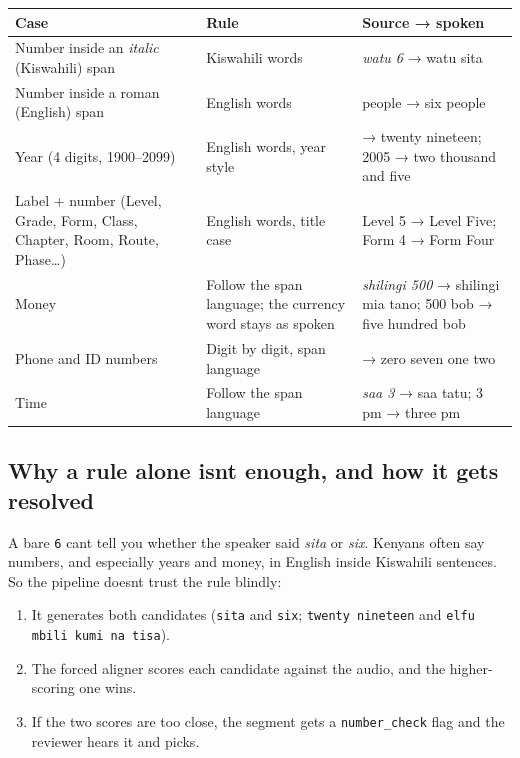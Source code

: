\documentclass[11pt]{article}
\begin{document}
\begin{longtable}[]{@{}>{\raggedright\arraybackslash}p{}>{\raggedright\arraybackslash}p{}>{\raggedright\arraybackslash}p{}@{}}
\toprule\noalign{}
Case & Rule & Source → spoken \\
\midrule\noalign{}
\endhead
\bottomrule\noalign{}
\endlastfoot
Number inside an \emph{italic} (Kiswahili) span & Kiswahili words & \emph{watu 6} → watu sita \\
Number inside a roman (English) span & English words & 6 people → six people \\
Year (4 digits, 1900--2099) & English words, year style & 2019 → twenty nineteen; 2005 → two thousand and five \\
Label + number (Level, Grade, Form, Class, Chapter, Room, Route, Phase\ldots) & English words, title case & Level 5 → Level Five; Form 4 → Form Four \\
Money & Follow the span language; the currency word stays as spoken & \emph{shilingi 500} → shilingi mia tano; 500 bob → five hundred bob \\
Phone and ID numbers & Digit by digit, span language & 0712 → zero seven one two \\
Time & Follow the span language & \emph{saa 3} → saa tatu; 3 pm → three pm \\
\end{longtable}

\hypertarget{why-a-rule-alone-isnt-enough-and-how-it-gets-resolved}{%
\subsection{Why a rule alone isn\textquotesingle t enough, and how it gets resolved}\label{why-a-rule-alone-isnt-enough-and-how-it-gets-resolved}}

A bare \texttt{6} can\textquotesingle t tell you whether the speaker said \emph{sita} or \emph{six}. Kenyans often say numbers, and especially years and money, in English inside Kiswahili sentences. So the pipeline doesn\textquotesingle t trust the rule blindly:

\begin{enumerate}
\def\labelenumi{\arabic{enumi}.}
\tightlist
\item
  It generates both candidates (\texttt{sita} and \texttt{six}; \texttt{twenty nineteen} and \texttt{elfu mbili kumi na tisa}).
\item
  The forced aligner scores each candidate against the audio, and the higher-scoring one wins.
\item
  If the two scores are too close, the segment gets a \texttt{number\_\allowbreak{}check} flag and the reviewer hears it and picks.
\end{enumerate}
\end{document}
